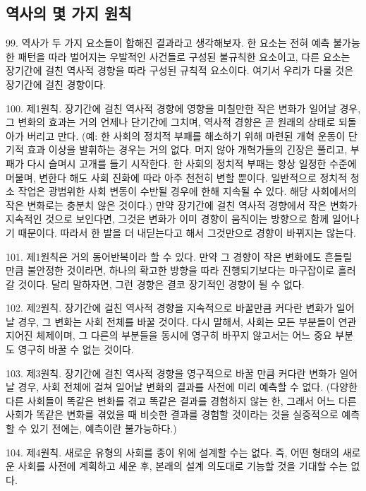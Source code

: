 \documentclass[11pt,a4paper]{article}
\begin{document}
\begin{multicols}{2}
\section*{역사의 몇 가지 원칙}


99. 역사가 두 가지 요소들이 합해진 결과라고 생각해보자. 한 요소는 전혀 예측 불가능한 패턴을 따라  벌어지는 우발적인 사건들로 구성된 불규칙한 요소이고, 다른 요소는 장기간에 걸친 역사적 경향을 따라  구성된 규칙적 요소이다. 여기서 우리가 다룰 것은 장기간에 걸친 경향이다. 


100. 제1원칙. 장기간에 걸친 역사적 경향에 영향을 미칠만한 작은 변화가 일어날 경우, 그 변화의  효과는 거의 언제나 단기간에 그치며, 역사적 경향은 곧 원래의 상태로 되돌아가 버리고 만다. (예: 한  사회의 정치적 부패를 해소하기 위해 마련된 개혁 운동이 단기적 효과 이상을 발휘하는 경우는 거의 없다. 머지 않아 개혁가들의 긴장은 풀리고, 부패가 다시 슬며시 고개를 들기 시작한다. 한 사회의 정치적  부패는 항상 일정한 수준에 머물며, 변한다 해도 사회 진화에 따라 아주 천천히 변할 뿐이다. 일반적으로  정치적 청소 작업은 광범위한 사회 변동이 수반될 경우에 한해 지속될 수 있다. 해당 사회에서의 작은  변화로는 충분치 않은 것이다.) 만약 장기간에 걸친 역사적 경향에서 작은 변화가 지속적인 것으로  보인다면, 그것은 변화가 이미 경향이 움직이는 방향으로 함께 일어나기 때문이다. 따라서 한 발을 더  내딛는다고 해서 그것만으로 경향이 바뀌지는 않는다. 


101. 제1원칙은 거의 동어반복이라 할 수 있다. 만약 그 경향이 작은 변화에도 흔들릴 만큼 불안정한  것이라면, 하나의 확고한 방향을 따라 진행되기보다는 마구잡이로 흘러갈 것이다. 달리 말하자면, 그런  경향은 결코 장기적인 경향이 될 수 없다.  


102. 제2원칙. 장기간에 걸친 역사적 경향을 지속적으로 바꿀만큼 커다란 변화가 일어날 경우, 그 변화는 사회 전체를 바꿀 것이다. 다시 말해서, 사회는 모든 부분들이 연관지어진 체제이며, 그 다른의 부분들을  동시에 영구히 바꾸지 않고서는 어느 중요 부분도 영구히 바꿀 수 없는 것이다.  


103. 제3원칙. 장기간에 걸친 역사적 경향을 영구적으로 바꿀 만큼 커다란 변화가 일어날 경우, 사회  전체에 걸쳐 일어날 변화의 결과를 사전에 미리 예측할 수 없다. (다양한 다른 사회들이 똑같은 변화를  겪고 똑같은 결과를 경험하지 않는 한, 그래서 어느 다른 사회가 똑같은 변화를 겪었을 때 비슷한 결과를  경험할 것이라는 것을 실증적으로 예측할 수 있기 전에는, 예측이란 불가능하다.)  


104. 제4원칙. 새로운 유형의 사회를 종이 위에 설계할 수는 없다. 즉, 어떤 형태의 새로운 사회를 사전에 계획하고 세운 후, 본래의 설계 의도대로 기능할 것을 기대할 수는 없다. 



\end{multicols}
\end{document}
